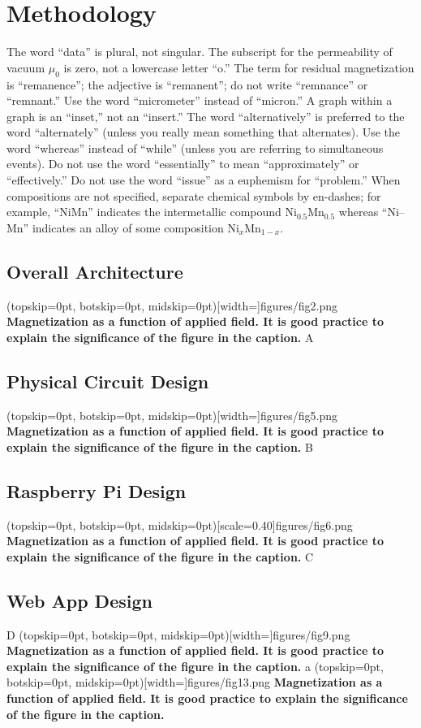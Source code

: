 \documentclass{ieeeaccess}
\begin{document}
\section{Methodology}
The word ``data'' is plural, not singular. The subscript for the
permeability of vacuum $\mu _{0}$ is zero, not a lowercase letter
``o.'' The term for residual magnetization is ``remanence''; the adjective
is ``remanent''; do not write ``remnance'' or ``remnant.'' Use the word
``micrometer'' instead of ``micron.'' A graph within a graph is an
``inset,'' not an ``insert.'' The word ``alternatively'' is preferred to the
word ``alternately'' (unless you really mean something that alternates). Use
the word ``whereas'' instead of ``while'' (unless you are referring to
simultaneous events). Do not use the word ``essentially'' to mean
``approximately'' or ``effectively.'' Do not use the word ``issue'' as a
euphemism for ``problem.'' When compositions are not specified, separate
chemical symbols by en-dashes; for example, ``NiMn'' indicates the
intermetallic compound Ni$_{0.5}$Mn$_{0.5}$ whereas
``Ni--Mn'' indicates an alloy of some composition
Ni$_{x}$Mn$_{1-x}$.

\subsection{Overall Architecture}
\Figure[t!](topskip=0pt, botskip=0pt, midskip=0pt)[width=\textwidth]{{figures/fig2.png}}
{ \textbf{Magnetization as a function of applied field.
It is good practice to explain the significance of the figure in the caption.}\label{fig1}}
A
\subsection{Physical Circuit Design}
\Figure[t!](topskip=0pt, botskip=0pt, midskip=0pt)[width=\textwidth]{{figures/fig5.png}}
{ \textbf{Magnetization as a function of applied field.
It is good practice to explain the significance of the figure in the caption.}\label{fig2}}
B
\subsection{Raspberry Pi Design}
\Figure[t!](topskip=0pt, botskip=0pt, midskip=0pt)[scale=0.40]{{figures/fig6.png}}
{ \textbf{Magnetization as a function of applied field.
It is good practice to explain the significance of the figure in the caption.}\label{fig3}}
C
\subsection{Web App Design}
D
\Figure[t!](topskip=0pt, botskip=0pt, midskip=0pt)[width=\textwidth]{{figures/fig9.png}}
{ \textbf{Magnetization as a function of applied field.
It is good practice to explain the significance of the figure in the caption.}\label{fig4}}
a
\Figure[t!](topskip=0pt, botskip=0pt, midskip=0pt)[width=\textwidth]{{figures/fig13.png}}
{ \textbf{Magnetization as a function of applied field.
It is good practice to explain the significance of the figure in the caption.}\label{fig5}}
\end{document}
